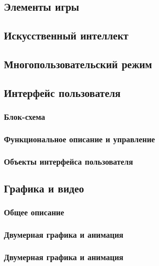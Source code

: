 \documentclass{article}
\begin{document}
\subsection{Элементы игры}

\subsection{Искусственный интеллект}

\subsection{Многопользовательский режим}

\subsection{Интерфейс пользователя}
\subsubsection{Блок-схема}

\subsubsection{Функциональное описание и управление}

\subsubsection{Объекты интерфейса пользователя}

\subsection{Графика и видео}
\subsubsection{Общее описание}
\subsubsection{Двумерная графика и анимация}
\subsubsection{Двумерная графика и анимация}
\end{document}
